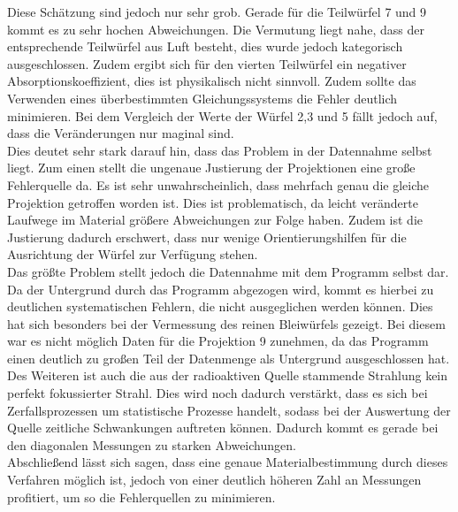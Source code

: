 Diese Schätzung sind jedoch nur sehr grob. Gerade für die Teilwürfel 7 und 9 kommt es zu sehr hochen Abweichungen. Die Vermutung liegt nahe, dass der entsprechende Teilwürfel aus Luft besteht, dies wurde jedoch kategorisch ausgeschlossen. Zudem ergibt sich für den vierten Teilwürfel ein negativer Absorptionskoeffizient, dies ist physikalisch nicht sinnvoll. Zudem sollte das Verwenden eines überbestimmten Gleichungssystems die Fehler deutlich minimieren. Bei dem Vergleich der Werte der Würfel 2,3 und 5 fällt jedoch auf, dass die Veränderungen nur maginal sind. \\
Dies deutet sehr stark darauf hin, dass das Problem in der Datennahme selbst liegt. Zum einen stellt die ungenaue Justierung der Projektionen eine große Fehlerquelle da. Es ist sehr unwahrscheinlich, dass mehrfach genau die gleiche Projektion getroffen worden ist. Dies ist problematisch, da leicht veränderte Laufwege im Material größere Abweichungen zur Folge haben. Zudem ist die Justierung dadurch erschwert, dass nur wenige Orientierungshilfen für die Ausrichtung der Würfel zur Verfügung stehen. \\
Das größte Problem stellt jedoch die Datennahme mit dem Programm selbst dar. Da der Untergrund durch das Programm abgezogen wird, kommt es hierbei zu deutlichen systematischen Fehlern, die nicht ausgeglichen werden können. Dies hat sich besonders bei der Vermessung des reinen Bleiwürfels gezeigt. Bei diesem war es nicht möglich Daten für die Projektion 9 zunehmen, da das Programm einen deutlich zu großen Teil der Datenmenge als Untergrund ausgeschlossen hat.\\
Des Weiteren ist auch die aus der radioaktiven Quelle stammende Strahlung kein
perfekt fokussierter Strahl. Dies wird noch dadurch verstärkt, dass es sich bei Zerfallsprozessen um statistische Prozesse handelt, sodass bei der Auswertung der Quelle zeitliche Schwankungen auftreten können. Dadurch kommt es gerade bei den diagonalen Messungen zu starken Abweichungen.\\
Abschließend lässt sich sagen, dass eine genaue Materialbestimmung durch dieses Verfahren möglich ist, jedoch von einer deutlich höheren Zahl an Messungen profitiert, um so die Fehlerquellen zu minimieren.
